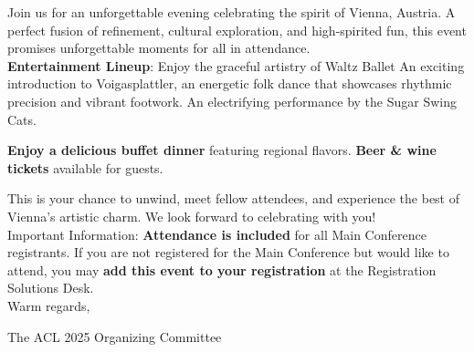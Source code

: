 Join us for an unforgettable evening celebrating the spirit of Vienna, Austria. A perfect fusion of refinement, cultural exploration, and high-spirited fun, this event promises unforgettable moments for all in attendance.\\

\textbf{Entertainment Lineup}:
Enjoy the graceful artistry of Waltz Ballet
An exciting introduction to Voigasplattler, an energetic folk dance that showcases rhythmic precision and vibrant footwork.
An electrifying performance by the Sugar Swing Cats.

\textbf{Enjoy a delicious buffet dinner} featuring regional flavors. 
\textbf{Beer \& wine tickets} available for guests.

This is your chance to unwind, meet fellow attendees, and experience the best of Vienna’s artistic charm. We look forward to celebrating with you!\\

Important Information:
\textbf{Attendance is included} for all Main Conference registrants.
If you are not registered for the Main Conference but would like to attend, you may \textbf{add this event to your registration} at the Registration Solutions Desk.\\

Warm regards,

The ACL 2025 Organizing Committee
